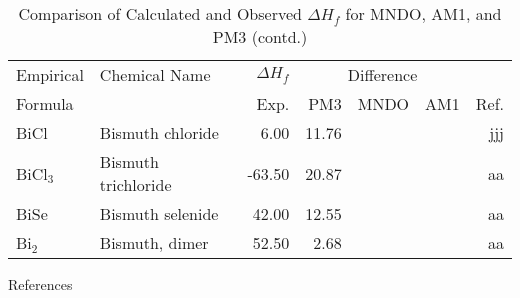 \begin{table}
\caption{Comparison of Calculated and Observed $\Delta H_f$ 
for MNDO, AM1, and PM3 (contd.)}
\begin{center}
\compresstable
\begin{tabular}{llrrrrr}
Empirical & Chemical Name & $\Delta H_f$ & \multicolumn{3}{c}{Difference} & \\
Formula   &               & Exp. & PM3 &  MNDO  &  AM1 &     Ref.\\
\hline
 BiCl        & Bismuth chloride                       &     6.00    &    11.76  &  &  &    jjj\\
 BiCl$_3$       & Bismuth trichloride                    &   -63.50    &    20.87  &  &  &     aa\\
 BiSe        & Bismuth selenide                       &    42.00    &    12.55  &  &  &     aa\\
 Bi$_2$         & Bismuth, dimer                         &    52.50    &     2.68  &  &  &     aa\\
\end{tabular}
\end{center}
\end{table}

\begin{center} References \end{center}

